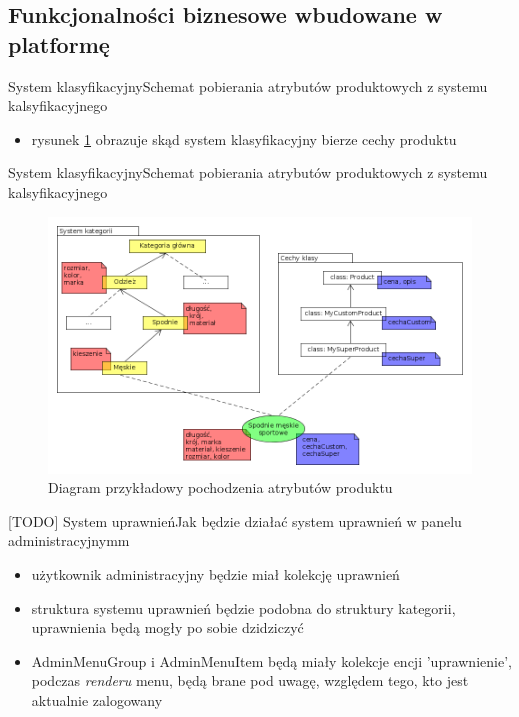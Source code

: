 \documentclass[polish,xcolor=table,9pt,aspectratio=1610,hyperref={pdfpagemode=FullScreen}]{beamer}
\begin{document}
\subsection{Funkcjonalności biznesowe wbudowane w platformę}

\begin{frame}{System klasyfikacyjny}{Schemat pobierania atrybutów produktowych z systemu kalsyfikacyjnego}
\begin{itemize}
	\begin{definition}{Systemu klasyfikacyjny}
		Jest to drzewiasta struktura kategorii połączona z encjami, które mogą przyjmować postać różnych cech produktu, definiować wartości tych cech łączyć je z produktem. Cechy są dzidziczne, zgodnie z ułożeniem drzewa kategorii.
	\end{definition}
	\item<1-> rysunek \ref{cechyProd} obrazuje skąd system klasyfikacyjny bierze cechy produktu
\end{itemize}
\end{frame}

\begin{frame}{System klasyfikacyjny}{Schemat pobierania atrybutów produktowych z systemu kalsyfikacyjnego}
	\begin{figure}
		\begin{center}
			\includegraphics[scale=0.3]{cechyProd.png}
		\end{center}
		\caption{{\color{black}Diagram przykładowy pochodzenia atrybutów produktu}} \label{cechyProd}
	\end{figure}
\end{frame}

\begin{frame}{[TODO] System uprawnień}{Jak będzie działać system uprawnień w panelu administracyjnymm}
\begin{itemize}
	\item<1-> użytkownik administracyjny będzie miał kolekcję uprawnień
	\item<1-> struktura systemu uprawnień będzie podobna do struktury kategorii, uprawnienia będą mogły po sobie dzidziczyć
	\item<1-> AdminMenuGroup i AdminMenuItem będą miały kolekcje encji 'uprawnienie', podczas \textit{renderu} menu, będą brane pod uwagę, względem tego, kto jest aktualnie zalogowany
\end{itemize}
\end{frame}
\end{document}
